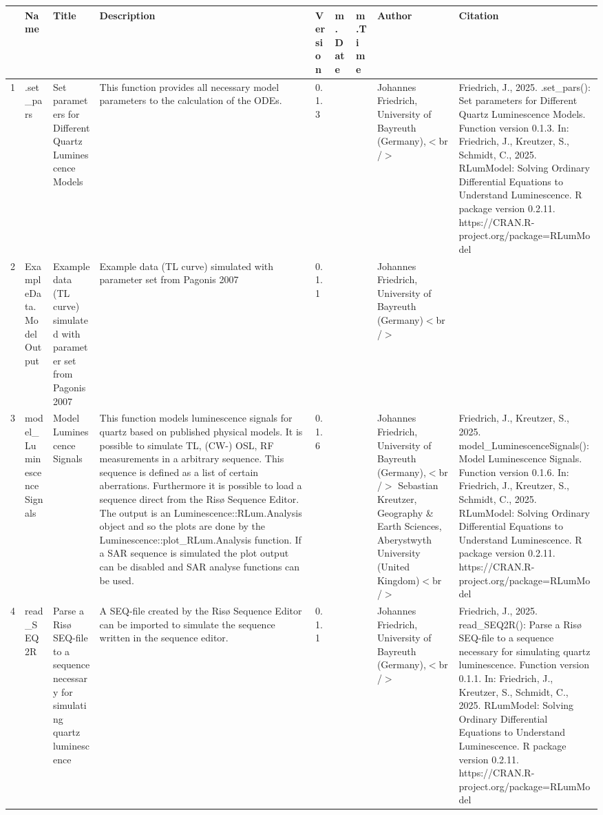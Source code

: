\begin{table}[ht]
\centering
\begin{tabular}{rllllllll}
  \hline
 & Name & Title & Description & Version & m.Date & m.Time & Author & Citation \\ 
  \hline
1 & .set\_pars & Set parameters for Different Quartz Luminescence Models & This function provides all necessary model parameters to the calculation of the ODEs. & 0.1.3
 &  &  & Johannes Friedrich, University of Bayreuth (Germany),$<$br /$>$ & Friedrich, J., 2025. .set\_pars(): Set parameters for Different Quartz Luminescence Models. Function version 0.1.3. In: Friedrich, J., Kreutzer, S., Schmidt, C., 2025. RLumModel: Solving Ordinary Differential Equations to Understand Luminescence. R package version 0.2.11. https://CRAN.R-project.org/package=RLumModel
 \\ 
  2 & ExampleData.ModelOutput & Example data (TL curve) simulated with parameter set from Pagonis 2007 & Example data (TL curve) simulated with parameter set from Pagonis 2007 & 0.1.1
 &  &  & Johannes Friedrich, University of Bayreuth (Germany)$<$br /$>$ &  \\ 
  3 & model\_LuminescenceSignals & Model Luminescence Signals & This function models luminescence signals for quartz based on published physical models. It is possible to simulate TL, (CW-) OSL, RF measurements in a arbitrary sequence. This sequence is defined as a  list  of certain aberrations. Furthermore it is possible to load a sequence direct from the Risø Sequence Editor. The output is an  Luminescence::RLum.Analysis  object and so the plots are done by the  Luminescence::plot\_RLum.Analysis  function. If a SAR sequence is simulated the plot output can be disabled and SAR analyse functions can be used. & 0.1.6
 &  &  & Johannes Friedrich, University of Bayreuth (Germany),$<$br /$>$ Sebastian Kreutzer, Geography \& Earth Sciences, Aberystwyth University (United Kingdom)$<$br /$>$ & Friedrich, J., Kreutzer, S., 2025. model\_LuminescenceSignals(): Model Luminescence Signals. Function version 0.1.6. In: Friedrich, J., Kreutzer, S., Schmidt, C., 2025. RLumModel: Solving Ordinary Differential Equations to Understand Luminescence. R package version 0.2.11. https://CRAN.R-project.org/package=RLumModel
 \\ 
  4 & read\_SEQ2R & Parse a Risø SEQ-file to a sequence necessary for simulating quartz luminescence & A SEQ-file created by the Risø Sequence Editor can be imported to simulate the sequence written in the sequence editor. & 0.1.1
 &  &  & Johannes Friedrich, University of Bayreuth (Germany),$<$br /$>$ & Friedrich, J., 2025. read\_SEQ2R(): Parse a Risø SEQ-file to a sequence necessary for simulating quartz luminescence. Function version 0.1.1. In: Friedrich, J., Kreutzer, S., Schmidt, C., 2025. RLumModel: Solving Ordinary Differential Equations to Understand Luminescence. R package version 0.2.11. https://CRAN.R-project.org/package=RLumModel

\end{tabular}
\end{table}

